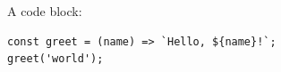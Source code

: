 A code block:

\begin{verbatim}
const greet = (name) => `Hello, ${name}!`;
greet('world');
\end{verbatim}

